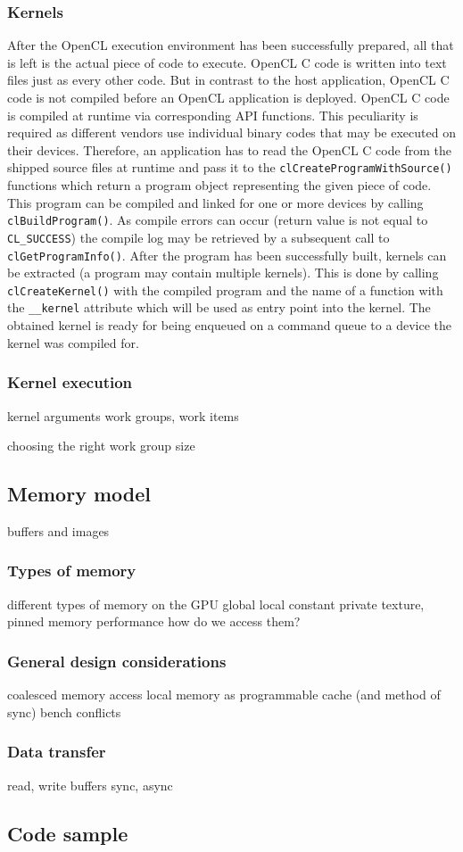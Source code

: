 \subsubsection{Kernels}
After the OpenCL execution environment has been successfully prepared, all that is left is the actual piece of code to execute. OpenCL C code is written into text files just as every other code. But in contrast to the host application, OpenCL C code is not compiled before an OpenCL application is deployed. OpenCL C code is compiled at runtime via corresponding API functions. This peculiarity is required as different vendors use individual binary codes that may be executed on their devices.
Therefore, an application has to read the OpenCL C code from the shipped source files at runtime and pass it to the \lstinline!clCreateProgramWithSource()! functions which return a program object representing the given piece of code. This program can be compiled and linked for one or more devices by calling \lstinline!clBuildProgram()!. As compile errors can occur (return value is not equal to \lstinline!CL_SUCCESS!) the compile log may be retrieved by a subsequent call to \lstinline!clGetProgramInfo()!. After the program has been successfully built, kernels can be extracted (a program may contain multiple kernels). This is done by calling \lstinline!clCreateKernel()! with the compiled program and the name of a function with the \lstinline!__kernel! attribute which will be used as entry point into the kernel. The obtained kernel is ready for being enqueued on a command queue to a device the kernel was compiled for. \cite[p.26, 27]{opencl_book}

\subsubsection{Kernel execution}
kernel arguments
work groups, work items

choosing the right work group size


\subsection{Memory model}
buffers and images

\subsubsection{Types of memory}
different types of memory on the GPU
global local constant private
texture, pinned memory
performance
how do we access them?

\subsubsection{General design considerations}
coalesced memory access
local memory as programmable cache (and method of sync)
bench conflicts

\subsubsection{Data transfer}
read, write buffers
sync, async

\subsection{Code sample}
\label{sec:code_sample}
